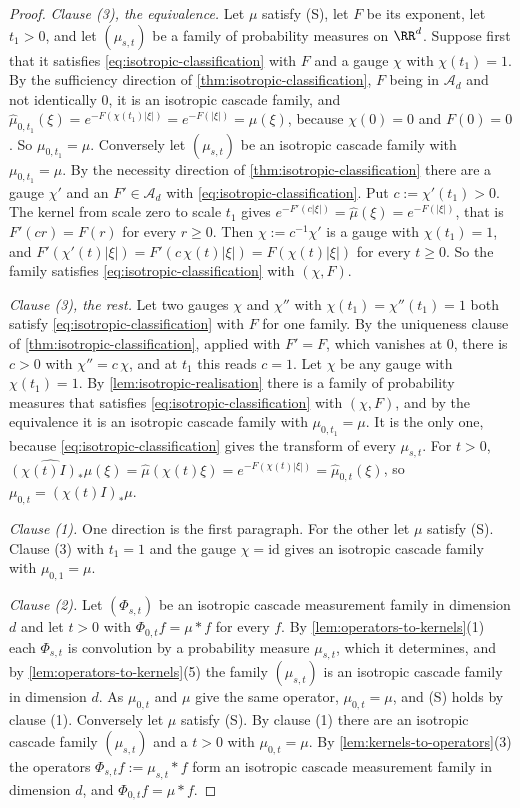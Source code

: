 \begin{proof}
\emph{Clause (3), the equivalence.} Let $\mu$ satisfy (S), let $F$ be its exponent, let
$t_1 > 0$, and let $(\mu_{s,t})$ be a family of probability measures on $\RR^d$. Suppose first
that it satisfies \ref{eq:isotropic-classification} with $F$ and a gauge $\chi$ with
$\chi(t_1) = 1$. By the sufficiency direction of \ref{thm:isotropic-classification}, $F$ being in
$\mathcal{A}_d$ and not identically $0$, it is an
isotropic cascade family, and
$\widehat\mu_{0,t_1}(\xi) = e^{-F(\chi(t_1)|\xi|)} = e^{-F(|\xi|)} = \widehat\mu(\xi)$, because
$\chi(0) = 0$ and $F(0) = 0$. So $\mu_{0,t_1} = \mu$. Conversely let $(\mu_{s,t})$ be an
isotropic cascade family with $\mu_{0,t_1} = \mu$. By the necessity direction of
\ref{thm:isotropic-classification} there are a gauge $\chi'$ and an $F' \in \mathcal{A}_d$ with
\ref{eq:isotropic-classification}. Put $c := \chi'(t_1) > 0$. The kernel from scale zero to
scale $t_1$ gives $e^{-F'(c|\xi|)} = \widehat\mu(\xi) = e^{-F(|\xi|)}$, that is $F'(cr) = F(r)$
for every $r \ge 0$. Then $\chi := c^{-1}\chi'$ is a gauge with $\chi(t_1) = 1$, and
$F'(\chi'(t)|\xi|) = F'(c\,\chi(t)|\xi|) = F(\chi(t)|\xi|)$ for every $t \ge 0$. So the family
satisfies \ref{eq:isotropic-classification} with $(\chi, F)$.

\emph{Clause (3), the rest.} Let two gauges $\chi$ and $\chi''$ with
$\chi(t_1) = \chi''(t_1) = 1$ both satisfy \ref{eq:isotropic-classification} with $F$ for one
family. By the uniqueness clause of \ref{thm:isotropic-classification}, applied with $F' = F$,
which vanishes at $0$, there is $c > 0$ with $\chi'' = c\,\chi$, and at $t_1$ this reads $c = 1$.
Let $\chi$ be any gauge with $\chi(t_1) = 1$. By \ref{lem:isotropic-realisation} there is a
family of probability measures that satisfies \ref{eq:isotropic-classification} with
$(\chi, F)$, and by the equivalence it is an isotropic cascade family with $\mu_{0,t_1} = \mu$.
It is the only one, because \ref{eq:isotropic-classification} gives the transform of every
$\mu_{s,t}$. For $t > 0$,
$\widehat{(\chi(t)I)_*\mu}(\xi) = \widehat\mu(\chi(t)\xi) = e^{-F(\chi(t)|\xi|)}
= \widehat\mu_{0,t}(\xi)$, so $\mu_{0,t} = (\chi(t)I)_*\mu$.

\emph{Clause (1).} One direction is the first paragraph. For the other let $\mu$ satisfy (S).
Clause (3) with $t_1 = 1$ and the gauge $\chi = \mathrm{id}$ gives an isotropic cascade family
with $\mu_{0,1} = \mu$.

\emph{Clause (2).} Let $(\Phi_{s,t})$ be an isotropic cascade measurement family in dimension
$d$ and let $t > 0$ with $\Phi_{0,t}f = \mu * f$ for every $f$. By
\ref{lem:operators-to-kernels}(1) each $\Phi_{s,t}$ is convolution by a probability measure
$\mu_{s,t}$, which it determines, and by \ref{lem:operators-to-kernels}(5) the family
$(\mu_{s,t})$ is an isotropic cascade family in dimension $d$. As $\mu_{0,t}$ and $\mu$ give the
same operator, $\mu_{0,t} = \mu$, and (S) holds by clause (1). Conversely let $\mu$ satisfy (S).
By clause (1) there are an isotropic cascade family $(\mu_{s,t})$ and a $t > 0$ with
$\mu_{0,t} = \mu$. By \ref{lem:kernels-to-operators}(3) the operators
$\Phi_{s,t}f := \mu_{s,t} * f$ form an isotropic cascade measurement family in dimension $d$,
and $\Phi_{0,t}f = \mu * f$.


\end{proof}
